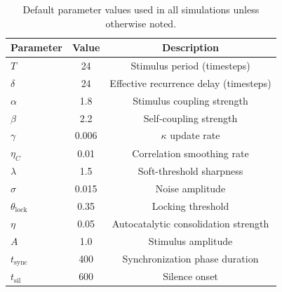 \documentclass[12pt,a4paper]{article}
\begin{document}
\begin{table}[h]

\centering

\caption{Default parameter values used in all simulations unless otherwise noted.}

\label{tab:supp_params}

\begin{tabular}{lcc}

\toprule

Parameter & Value & Description \\

\midrule

$T$ & 24 & Stimulus period (timesteps) \\

$\delta$ & 24 & Effective recurrence delay (timesteps) \\

$\alpha$ & 1.8 & Stimulus coupling strength \\

$\beta$ & 2.2 & Self-coupling strength \\

$\gamma$ & 0.006 & $\kappa$ update rate \\

$\eta_C$ & 0.01 & Correlation smoothing rate \\

$\lambda$ & 1.5 & Soft-threshold sharpness \\

$\sigma$ & 0.015 & Noise amplitude \\

$\theta_{\mathrm{lock}}$ & 0.35 & Locking threshold \\

$\eta$ & 0.05 & Autocatalytic consolidation strength \\

$A$ & 1.0 & Stimulus amplitude \\

$t_{\mathrm{sync}}$ & 400 & Synchronization phase duration \\

$t_{\mathrm{sil}}$ & 600 & Silence onset \\

\bottomrule

\end{tabular}

\end{table}
\end{document}
